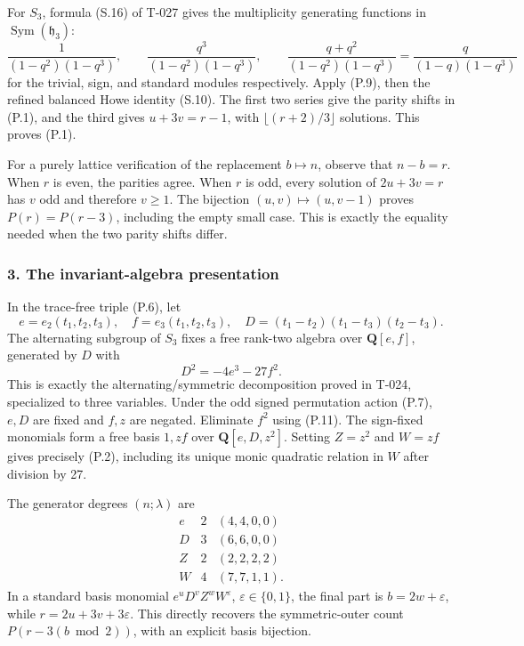 \documentclass[
  10pt,
]{article}
\begin{document}
For \(S_3\), formula (S.16) of T-027 gives the multiplicity generating
functions in \(\operatorname{Sym}(\mathfrak h_3)\): \[
\frac1{(1-q^2)(1-q^3)},\qquad
\frac{q^3}{(1-q^2)(1-q^3)},\qquad
\frac{q+q^2}{(1-q^2)(1-q^3)}
=\frac q{(1-q)(1-q^3)}
\tag{P.10}
\] for the trivial, sign, and standard modules respectively. Apply
(P.9), then the refined balanced Howe identity (S.10). The first two
series give the parity shifts in (P.1), and the third gives
\(u+3v=r-1\), with \(\lfloor(r+2)/3\rfloor\) solutions. This proves
(P.1).

For a purely lattice verification of the replacement \(b\mapsto n\),
observe that \(n-b=r\). When \(r\) is even, the parities agree. When
\(r\) is odd, every solution of \(2u+3v=r\) has \(v\) odd and therefore
\(v\ge1\). The bijection \((u,v)\mapsto(u,v-1)\) proves \(P(r)=P(r-3)\),
including the empty small case. This is exactly the equality needed when
the two parity shifts differ.

\subsubsection{3. The invariant-algebra
presentation}\label{the-invariant-algebra-presentation}

In the trace-free triple (P.6), let \[
e=e_2(t_1,t_2,t_3),\quad f=e_3(t_1,t_2,t_3),
\quad D=(t_1-t_2)(t_1-t_3)(t_2-t_3).
\] The alternating subgroup of \(S_3\) fixes a free rank-two algebra
over \(\mathbf Q[e,f]\), generated by \(D\) with \[
D^2=-4e^3-27f^2.
\tag{P.11}
\] This is exactly the alternating/symmetric decomposition proved in
T-024, specialized to three variables. Under the odd signed permutation
action (P.7), \(e,D\) are fixed and \(f,z\) are negated. Eliminate
\(f^2\) using (P.11). The sign-fixed monomials form a free basis
\(1,zf\) over \(\mathbf Q[e,D,z^2]\). Setting \(Z=z^2\) and \(W=zf\)
gives precisely (P.2), including its unique monic quadratic relation in
\(W\) after division by 27.

The generator degrees \((n;\lambda)\) are \[
\begin{array}{c|c|c}
e&2&(4,4,0,0)\\
D&3&(6,6,0,0)\\
Z&2&(2,2,2,2)\\
W&4&(7,7,1,1).
\end{array}
\tag{P.12}
\] In a standard basis monomial \(e^uD^vZ^wW^\varepsilon\),
\(\varepsilon\in\{0,1\}\), the final part is \(b=2w+\varepsilon\), while
\(r=2u+3v+3\varepsilon\). This directly recovers the symmetric-outer
count \(P(r-3(b\bmod2))\), with an explicit basis bijection.
\end{document}
